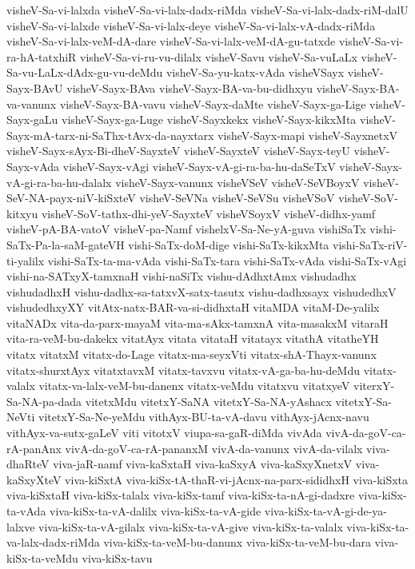 {visheV-Sa-vi-lalxda
visheV-Sa-vi-lalx-dadx-riMda
visheV-Sa-vi-lalx-dadx-riM-dalU
visheV-Sa-vi-lalxde
visheV-Sa-vi-lalx-deye
visheV-Sa-vi-lalx-vA-dadx-riMda
visheV-Sa-vi-lalx-veM-dA-dare
visheV-Sa-vi-lalx-veM-dA-gu-tatxde
visheV-Sa-vi-ra-hA-tatxhiR
visheV-Sa-vi-ru-vu-dilalx
visheV-Savu
visheV-Sa-vuLaLx
visheV-Sa-vu-LaLx-dAdx-gu-vu-deMdu
visheV-Sa-yu-katx-vAda
visheVSayx
visheV-Sayx-BAvU
visheV-Sayx-BAva
visheV-Sayx-BA-va-bu-didhxyu
visheV-Sayx-BA-va-vanunx
visheV-Sayx-BA-vavu
visheV-Sayx-daMte
visheV-Sayx-ga-Lige
visheV-Sayx-gaLu
visheV-Sayx-ga-Luge
visheV-Sayxkekx
visheV-Sayx-kikxMta
visheV-Sayx-mA-tarx-ni-SaThx-tAvx-da-nayxtarx
visheV-Sayx-mapi
visheV-SayxnetxV
visheV-Sayx-sAyx-Bi-dheV-SayxteV
visheV-SayxteV
visheV-Sayx-teyU
visheV-Sayx-vAda
visheV-Sayx-vAgi
visheV-Sayx-vA-gi-ra-ba-hu-daSeTxV
visheV-Sayx-vA-gi-ra-ba-hu-dalalx
visheV-Sayx-vanunx
visheVSeV
visheV-SeVBoyxV
visheV-SeV-NA-payx-niV-kiSxteV
visheV-SeVNa
visheV-SeVSu
visheVSoV
visheV-SoV-kitxyu
visheV-SoV-tathx-dhi-yeV-SayxteV
visheVSoyxV
visheV-didhx-yamf
visheV-pA-BA-vatoV
visheV-pa-Namf
vishelxV-Sa-Ne-yA-guva
vishiSaTx
vishi-SaTx-Pa-la-saM-gateVH
vishi-SaTx-doM-dige
vishi-SaTx-kikxMta
vishi-SaTx-riV-ti-yalilx
vishi-SaTx-ta-ma-vAda
vishi-SaTx-tara
vishi-SaTx-vAda
vishi-SaTx-vAgi
vishi-na-SATxyX-tamxnaH
vishi-naSiTx
vishu-dAdhxtAmx
vishudadhx
vishudadhxH
vishu-dadhx-sa-tatxvX-satx-tasutx
vishu-dadhxsayx
vishudedhxV
vishudedhxyXY
vitAtx-natx-BAR-va-si-didhxtaH
vitaMDA
vitaM-De-yalilx
vitaNADx
vita-da-parx-mayaM
vita-ma-sAkx-tamxnA
vita-masakxM
vitaraH
vita-ra-veM-bu-dakekx
vitatAyx
vitata
vitataH
vitatayx
vitathA
vitatheYH
vitatx
vitatxM
vitatx-do-Lage
vitatx-ma-seyxVti
vitatx-shA-Thayx-vanunx
vitatx-shurxtAyx
vitatxtavxM
vitatx-tavxvu
vitatx-vA-ga-ba-hu-deMdu
vitatx-valalx
vitatx-va-lalx-veM-bu-danenx
vitatx-veMdu
vitatxvu
vitatxyeV
viterxY-Sa-NA-pa-dada
vitetxMdu
vitetxY-SaNA
vitetxY-Sa-NA-yAshacx
vitetxY-Sa-NeVti
vitetxY-Sa-Ne-yeMdu
vithAyx-BU-ta-vA-davu
vithAyx-jAcnx-navu
vithAyx-va-sutx-gaLeV
viti
vitotxV
viupa-sa-gaR-diMda
vivAda
vivA-da-goV-ca-rA-panAnx
vivA-da-goV-ca-rA-pananxM
vivA-da-vanunx
vivA-da-vilalx
viva-dhaRteV
viva-jaR-namf
viva-kaSxtaH
viva-kaSxyA
viva-kaSxyXnetxV
viva-kaSxyXteV
viva-kiSxtA
viva-kiSx-tA-thaR-vi-jAcnx-na-parx-sididhxH
viva-kiSxta
viva-kiSxtaH
viva-kiSx-talalx
viva-kiSx-tamf
viva-kiSx-ta-nA-gi-dadxre
viva-kiSx-ta-vAda
viva-kiSx-ta-vA-dalilx
viva-kiSx-ta-vA-gide
viva-kiSx-ta-vA-gi-de-ya-lalxve
viva-kiSx-ta-vA-gilalx
viva-kiSx-ta-vA-give
viva-kiSx-ta-valalx
viva-kiSx-ta-va-lalx-dadx-riMda
viva-kiSx-ta-veM-bu-danunx
viva-kiSx-ta-veM-bu-dara
viva-kiSx-ta-veMdu
viva-kiSx-tavu
}
